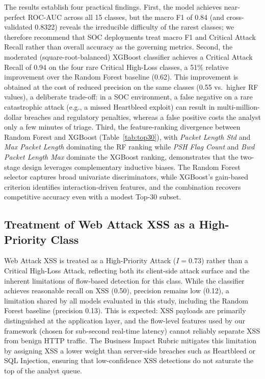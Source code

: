 \documentclass[conference]{IEEEtran}
\begin{document}
The results establish four practical findings. First, the model achieves 
near-perfect ROC-AUC across all 15 classes, but the macro F1 of 0.84 (and cross-validated 0.8322) reveals the irreducible difficulty of the rarest classes; we therefore recommend that SOC deployments treat 
macro F1 and Critical Attack Recall rather than overall accuracy as 
the governing metrics. Second, the moderated (square-root-balanced) 
XGBoost classifier achieves a Critical Attack Recall of 0.94 on the 
four rare Critical High-Loss classes, a 51\% relative improvement 
over the Random Forest baseline (0.62). This improvement is obtained 
at the cost of reduced precision on the same classes (0.55 vs.~higher 
RF values), a deliberate trade-off: in a SOC environment, a false 
negative on a rare catastrophic attack (e.g., a missed Heartbleed 
exploit) can result in multi-million-dollar breaches and regulatory 
penalties, whereas a false positive costs the analyst only a few 
minutes of triage. Third, the feature-ranking divergence between Random Forest and 
XGBoost (Table~\ref{tab:top30}), with \textit{Packet Length Std} and 
\textit{Max Packet Length} dominating the RF ranking while \textit{PSH 
Flag Count} and \textit{Bwd Packet Length Max} dominate the XGBoost 
ranking, demonstrates that the two-stage design leverages complementary 
inductive biases. The Random Forest selector captures broad univariate 
discriminators, while XGBoost's gain-based criterion identifies 
interaction-driven features, and the combination recovers competitive 
accuracy even with a modest Top-30 subset.

\subsection{Treatment of Web Attack XSS as a High-Priority Class}
\label{subsec:xss_treatment}

Web Attack XSS is treated as a High-Priority Attack ($I = 0.73$) 
rather than a Critical High-Loss Attack, reflecting both its 
client-side attack surface and the inherent limitations of 
flow-based detection for this class. While the classifier achieves 
reasonable recall on XSS (0.50), precision remains low (0.12), a 
limitation shared by all models evaluated in this study, including 
the Random Forest baseline (precision 0.13). This is expected: XSS 
payloads are primarily distinguished at the application layer, and 
the flow-level features used by our framework (chosen for sub-second 
real-time latency) cannot reliably separate XSS from benign HTTP 
traffic. The Business Impact Rubric mitigates this limitation by 
assigning XSS a lower weight than server-side breaches such as 
Heartbleed or SQL Injection, ensuring that low-confidence XSS 
detections do not saturate the top of the analyst queue.
\end{document}
